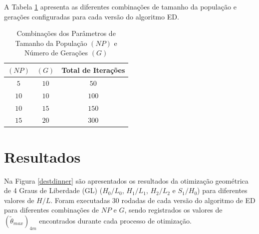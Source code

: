 \documentclass[12pt,A4,A4pt]{article}
\begin{document}
A Tabela \ref{tab:popgeracao} apresenta as diferentes combinações de tamanho da população e gerações configuradas para cada versão do algoritmo ED.

\begin{table}[htbp]
\small
\centering
\caption{\small Combinações dos Parâmetros de Tamanho da População $(NP)$ e Número de Gerações $(G)$}
\begin{tabular}{ccc}
\hline
$(NP)$ & $(G)$ & Total de Iterações \\
\hline
$5$ & $10$ & $50$	\\
$10$ & $10$ & $100$	\\
$10$ & $15$ & $150$	\\
$15$ & $20$ & $300$	\\
\hline
\end{tabular}
  \label{tab:popgeracao}
\end{table}

\section{Resultados}
\label{result}
\hspace{0.5cm}Na Figura \ref{destdinner} são apresentados os resultados da otimização geométrica de 4 Graus de Liberdade (GL) ($H_{0}/L_{0}$, $H_{1}/L_{1}$, $H_{2}/L_{2}$ e $S_{1}/H_{0}$) para diferentes valores de $H/L$. Foram executadas 30 rodadas de cada versão do algoritmo de ED para diferentes combinações de $NP$ e $G$, sendo registrados os valores de $({\tilde{\theta}}_{max})_{4m}$ encontrados durante cada processo de otimização. 
\end{document}
